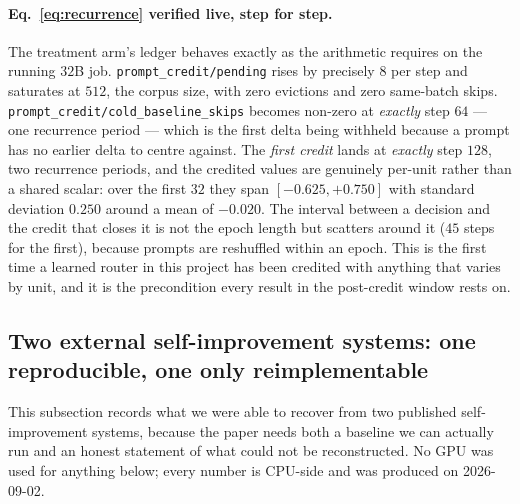 \paragraph{Eq.~\ref{eq:recurrence} verified live, step for step.} The treatment arm's ledger
behaves exactly as the arithmetic requires on the running $32$B job.
\texttt{prompt\_credit/pending} rises by precisely $8$ per step and saturates at $512$, the
corpus size, with zero evictions and zero same-batch skips.
\texttt{prompt\_credit/cold\_baseline\_skips} becomes non-zero at \emph{exactly} step $64$ ---
one recurrence period --- which is the first delta being withheld because a prompt has no
earlier delta to centre against. The \emph{first credit} lands at \emph{exactly} step $128$,
two recurrence periods, and the credited values are genuinely per-unit rather than a shared
scalar: over the first $32$ they span $[-0.625, +0.750]$ with standard deviation $0.250$
around a mean of $-0.020$. The interval between a decision and the credit that closes it is not
the epoch length but scatters around it ($45$ steps for the first), because prompts are
reshuffled within an epoch. This is the first time a learned router in this project has been
credited with anything that varies by unit, and it is the precondition every result in the
post-credit window rests on.

\subsection{Two external self-improvement systems: one reproducible, one only reimplementable}
\label{sec:external}

This subsection records what we were able to recover from two published self-improvement
systems, because the paper needs both a baseline we can actually run and an honest
statement of what could not be reconstructed. No GPU was used for anything below; every
number is CPU-side and was produced on 2026-09-02.

